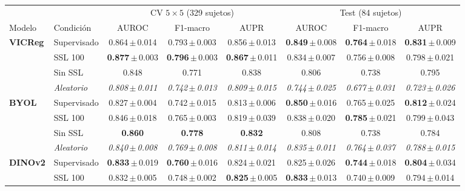 \documentclass[11pt,a4paper]{article}
\begin{document}
\begin{table}[H]
\centering
\scriptsize
\setlength{\tabcolsep}{3.2pt}
\begin{tabular}{llcccccc}
\toprule
 & & \multicolumn{3}{c}{CV $5\times5$ (329 sujetos)} & \multicolumn{3}{c}{Test (84 sujetos)} \\
\cmidrule(lr){3-5}\cmidrule(lr){6-8}
Modelo & Condición & AUROC & F1-macro & AUPR & AUROC & F1-macro & AUPR \\
\midrule
\multirow{4}{*}{\textcolor{vicregc}{\textbf{VICReg}}}
 & Supervisado & 0.864\,$\pm$\,0.014 & 0.793\,$\pm$\,0.003 & 0.856\,$\pm$\,0.013 & \textbf{0.849}\,$\pm$\,0.008 & \textbf{0.764}\,$\pm$\,0.018 & \textbf{0.831}\,$\pm$\,0.009 \\
 & SSL 100 & \textbf{0.877}\,$\pm$\,0.003 & \textbf{0.796}\,$\pm$\,0.003 & \textbf{0.867}\,$\pm$\,0.011 & 0.834\,$\pm$\,0.007 & 0.756\,$\pm$\,0.008 & 0.798\,$\pm$\,0.021 \\
 & Sin SSL & 0.848 & 0.771 & 0.838 & 0.806 & 0.738 & 0.795 \\
 & \textit{Aleatorio} & \textit{0.808\,$\pm$\,0.011} & \textit{0.742\,$\pm$\,0.013} & \textit{0.809\,$\pm$\,0.015} & \textit{0.744\,$\pm$\,0.025} & \textit{0.677\,$\pm$\,0.031} & \textit{0.723\,$\pm$\,0.026} \\
\midrule
\multirow{4}{*}{\textcolor{byolc}{\textbf{BYOL}}}
 & Supervisado & 0.827\,$\pm$\,0.004 & 0.742\,$\pm$\,0.015 & 0.813\,$\pm$\,0.006 & \textbf{0.850}\,$\pm$\,0.016 & 0.765\,$\pm$\,0.025 & \textbf{0.812}\,$\pm$\,0.024 \\
 & SSL 100 & 0.846\,$\pm$\,0.018 & 0.765\,$\pm$\,0.003 & 0.819\,$\pm$\,0.039 & 0.838\,$\pm$\,0.020 & \textbf{0.785}\,$\pm$\,0.021 & 0.799\,$\pm$\,0.043 \\
 & Sin SSL & \textbf{0.860} & \textbf{0.778} & \textbf{0.832} & 0.808 & 0.738 & 0.784 \\
 & \textit{Aleatorio} & \textit{0.840\,$\pm$\,0.008} & \textit{0.769\,$\pm$\,0.008} & \textit{0.811\,$\pm$\,0.014} & \textit{0.835\,$\pm$\,0.011} & \textit{0.764\,$\pm$\,0.037} & \textit{0.788\,$\pm$\,0.015} \\
\midrule
\multirow{4}{*}{\textcolor{dinoc}{\textbf{DINOv2}}}
 & Supervisado & \textbf{0.833}\,$\pm$\,0.019 & \textbf{0.760}\,$\pm$\,0.016 & 0.824\,$\pm$\,0.021 & 0.825\,$\pm$\,0.026 & \textbf{0.744}\,$\pm$\,0.018 & \textbf{0.804}\,$\pm$\,0.034 \\
 & SSL 100 & 0.832\,$\pm$\,0.005 & 0.748\,$\pm$\,0.002 & \textbf{0.825}\,$\pm$\,0.005 & \textbf{0.833}\,$\pm$\,0.013 & 0.740\,$\pm$\,0.009 & 0.794\,$\pm$\,0.014 \\

\end{tabular}
\end{table}
\end{document}
